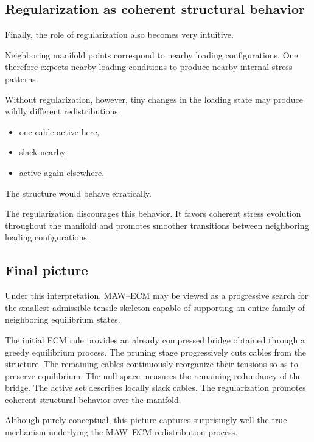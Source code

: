 \documentclass[11pt,a4paper]{article}
\begin{document}
\subsection{Regularization as coherent structural behavior}

Finally, the role of regularization also becomes very intuitive.

Neighboring manifold points correspond to nearby loading configurations. One
therefore expects nearby loading conditions to produce nearby internal stress
patterns.

Without regularization, however, tiny changes in the loading state may produce
wildly different redistributions:
\begin{itemize}
    \item one cable active here,
    \item slack nearby,
    \item active again elsewhere.
\end{itemize}

The structure would behave erratically.

The regularization discourages this behavior. It favors coherent stress
evolution throughout the manifold and promotes smoother transitions between
neighboring loading configurations.

\subsection{Final picture}

Under this interpretation, MAW--ECM may be viewed as a progressive search for
the smallest admissible tensile skeleton capable of supporting an entire family
of neighboring equilibrium states.

The initial ECM rule provides an already compressed bridge obtained through a
greedy equilibrium process. The pruning stage progressively cuts cables from
the structure. The remaining cables continuously reorganize their tensions so
as to preserve equilibrium. The null space measures the remaining redundancy of
the bridge. The active set describes locally slack cables. The regularization
promotes coherent structural behavior over the manifold.

Although purely conceptual, this picture captures surprisingly well the true
mechanism underlying the MAW--ECM redistribution process.
\end{document}
